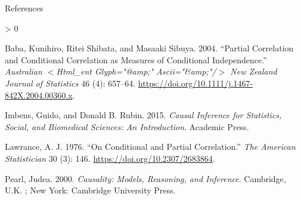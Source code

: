 \documentclass[
  8pt,
  ignorenonframetext,
]{beamer}
\newlength{\cslhangindent}
\newenvironment{CSLReferences}[2] %
 {%
  \setlength{\parindent}{0pt}
  \ifodd #1 \everypar{\setlength{\hangindent}{\cslhangindent}}\ignorespaces\fi
  \ifnum #2 > 0
  \setlength{\parskip}{#2\baselineskip}
  \fi
 }%
 {}
\begin{document}
\begin{frame}{References}
\protect\hypertarget{references}{}
\footnotesize

\hypertarget{refs}{}
\begin{CSLReferences}{1}{0}
\leavevmode\hypertarget{ref-baba_2004}{}%
Baba, Kunihiro, Ritei Shibata, and Masaaki Sibuya. 2004. {``Partial
Correlation and Conditional Correlation as Measures of Conditional
Independence.''} \emph{Australian {\(<\)}Html\_ent Glyph="@amp;"
Ascii="\&amp;"/{\(>\)} New Zealand Journal of Statistics} 46 (4):
657--64. \url{https://doi.org/10.1111/j.1467-842X.2004.00360.x}.

\leavevmode\hypertarget{ref-imbens_2015}{}%
Imbens, Guido, and Donald B. Rubin. 2015. \emph{Causal {Inference} for
{Statistics}, {Social}, and {Biomedical Sciences}: {An Introduction}}.
{Academic Press}.

\leavevmode\hypertarget{ref-lawrance_1976}{}%
Lawrance, A. J. 1976. {``On {Conditional} and {Partial Correlation}.''}
\emph{The American Statistician} 30 (3): 146.
\url{https://doi.org/10.2307/2683864}.

\leavevmode\hypertarget{ref-pearl_2000}{}%
Pearl, Judea. 2000. \emph{Causality: Models, Reasoning, and Inference}.
{Cambridge, U.K. ; New York}: {Cambridge University Press}.

\end{CSLReferences}
\end{frame}
\end{document}
